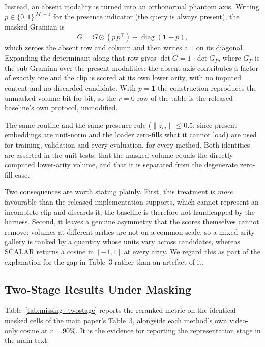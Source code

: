 \documentclass[10pt,twocolumn,letterpaper]{article}
\newcommand{\ours}{SCALAR}
\begin{document}
Instead, an absent modality is turned into an orthonormal phantom axis. Writing
$p \in \{0,1\}^{|M|+1}$ for the presence indicator (the query is always
present), the masked Gramian is
\begin{equation}
\tilde{G} = G \odot (p\,p^{\!\top}) + \operatorname{diag}(\mathbf{1} - p),
\label{eq:maskedgram}
\end{equation}
which zeroes the absent row and column and then writes a $1$ on its diagonal.
Expanding the determinant along that row gives
$\det \tilde{G} = 1 \cdot \det G_{P}$, where $G_{P}$ is the sub-Gramian over the
present modalities: the absent axis contributes a factor of exactly one and the
clip is scored at its own lower arity, with no imputed content and no
discarded candidate. With $p = \mathbf{1}$ the construction reproduces the
unmasked volume bit-for-bit, so the $r{=}0$ row of the table is the released
baseline's own protocol, unmodified.

The same routine and the same presence rule ($\|z_m\| \le 0.5$, since present
embeddings are unit-norm and the loader zero-fills what it cannot load) are used
for training, validation and every evaluation, for every method. Both identities
are asserted in the unit tests: that the masked volume equals the directly
computed lower-arity volume, and that it is separated from the degenerate
zero-fill case.

Two consequences are worth stating plainly. First, this treatment is
\emph{more} favourable than the released implementation supports, which cannot
represent an incomplete clip and discards it; the baseline is therefore not
handicapped by the harness. Second, it leaves a genuine asymmetry that the
scores themselves cannot remove: volumes at different arities are not on a
common scale, so a mixed-arity gallery is ranked by a quantity whose units vary
across candidates, whereas \ours{} returns a cosine in $[-1,1]$ at every arity.
We regard this as part of the explanation for the gap in Table~3 rather than an
artefact of it.

\subsection{Two-Stage Results Under Masking}
\label{sec:twostage}

Table~\ref{tab:missing_twostage} reports the reranked metric on the identical
masked cells of the main paper's Table~3, alongside each method's own video-only
cosine at $r{=}90\%$. It is the evidence for reporting the representation stage
in the main text.
\end{document}
